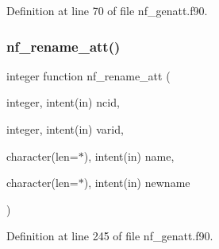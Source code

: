 Definition at line 70 of file nf\+\_\+genatt.\+f90.

\mbox{\label{nf__genatt_8f90_a39b8be3cb9754c08c98f10e0b33efc19}} 
\subsubsection{\texorpdfstring{nf\+\_\+rename\+\_\+att()}{nf\_rename\_att()}}
{\footnotesize\ttfamily integer function nf\+\_\+rename\+\_\+att (\begin{DoxyParamCaption}\item[{integer, intent(in)}]{ncid,  }\item[{integer, intent(in)}]{varid,  }\item[{character(len=$\ast$), intent(in)}]{name,  }\item[{character(len=$\ast$), intent(in)}]{newname }\end{DoxyParamCaption})}



Definition at line 245 of file nf\+\_\+genatt.\+f90.

